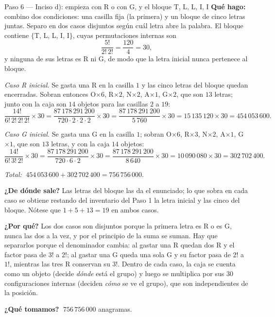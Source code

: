 \documentclass[11pt]{article}
\begin{document}
\begin{paso}{Paso 6 --- Inciso d): empieza con R o con G, y el bloque T, L, L, I, I}
\textbf{Qué hago:} combino dos condiciones: una casilla fija (la primera) y un bloque de cinco letras
juntas. Separo en dos casos disjuntos según cuál letra abre la palabra. El bloque contiene
$\{$T, L, L, I, I$\}$, cuyas permutaciones internas son
\[
\frac{5!}{2!\,2!}=\frac{120}{4}=30 ,
\]
y ninguna de sus letras es R ni G, de modo que la letra inicial nunca pertenece al bloque.

\medskip
\emph{Caso R inicial.} Se gasta una R en la casilla $1$ y las cinco letras del bloque quedan encerradas.
Sobran entonces O$\times6$, R$\times2$, N$\times2$, A$\times1$, G$\times2$, que son $13$ letras; junto con
la caja son $14$ objetos para las casillas $2$ a $19$:
\[
\frac{14!}{6!\,2!\,2!\,2!}\times30=\frac{87\,178\,291\,200}{720\cdot2\cdot2\cdot2}\times30
=\frac{87\,178\,291\,200}{5\,760}\times30=15\,135\,120\times30=454\,053\,600 .
\]

\medskip
\emph{Caso G inicial.} Se gasta una G en la casilla $1$; sobran O$\times6$, R$\times3$, N$\times2$,
A$\times1$, G$\times1$, que son $13$ letras, y con la caja $14$ objetos:
\[
\frac{14!}{6!\,3!\,2!}\times30=\frac{87\,178\,291\,200}{720\cdot6\cdot2}\times30
=\frac{87\,178\,291\,200}{8\,640}\times30=10\,090\,080\times30=302\,702\,400 .
\]

\medskip
\emph{Total:} $\;454\,053\,600+302\,702\,400=756\,756\,000 .$

\textbf{¿De dónde sale?} Las letras del bloque las da el enunciado; lo que sobra en cada caso se obtiene
restando del inventario del Paso 1 la letra inicial y las cinco del bloque. Nótese que $1+5+13=19$ en
ambos casos.

\textbf{¿Por qué?} Los dos casos son disjuntos porque la primera letra es R o es G, nunca las dos a la vez,
y por el principio de la suma se suman. Hay que separarlos porque el denominador cambia: al gastar una R
quedan dos R y el factor pasa de $3!$ a $2!$; al gastar una G queda una sola G y su factor pasa de $2!$ a
$1!$, mientras las tres R conservan su $3!$. Dentro de cada caso, la caja se cuenta como un objeto (decide
\emph{dónde} está el grupo) y luego se multiplica por sus $30$ configuraciones internas (deciden
\emph{cómo} se ve el grupo), que son independientes de la posición.

\textbf{¿Qué tomamos?} $\;756\,756\,000$ anagramas.
\end{paso}
\end{document}
